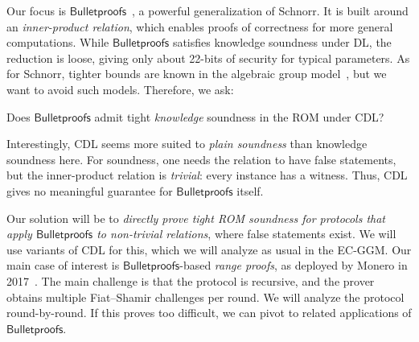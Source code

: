 Our focus is $\mathsf{Bulletproofs}$~\cite{Bulletproofs}, a powerful generalization of Schnorr. It is built around an \emph{inner-product relation}, which enables  proofs of
correctness for more general computations. While $\mathsf{Bulletproofs}$ satisfies knowledge 
soundness under DL, the reduction is loose, giving only about 22-bits of  
security for typical parameters. As for Schnorr, tighter bounds are known in the algebraic group model~\cite{C:GhoTes21}, 
but we want to avoid such models. Therefore, we ask:

\begin{ques}
Does $\mathsf{Bulletproofs}$ admit tight \emph{knowledge} soundness in the ROM under CDL?
\end{ques}

Interestingly, CDL seems more suited to \emph{plain soundness} than knowledge soundness here. 
For soundness, one needs the relation to have  false statements, but the inner-product relation is \emph{trivial}: 
every instance has a witness. Thus, CDL gives no meaningful guarantee for $\mathsf{Bulletproofs}$ itself. 

Our solution will be to \emph{directly prove tight ROM soundness for protocols that apply 
$\mathsf{Bulletproofs}$ to non-trivial relations}, where false statements exist. We will use variants of CDL for this, which we will analyze as usual in the EC-GGM. Our main case of interest is 
$\mathsf{Bulletproofs}$-based \emph{range proofs}, as deployed by Monero in 2017~\cite{monero1}. The main challenge is that the protocol is recursive, and the prover obtains multiple 
Fiat–Shamir challenges per round. We will analyze the protocol round-by-round. If this proves too difficult, we can pivot to related applications of $\mathsf{Bulletproofs}$.


